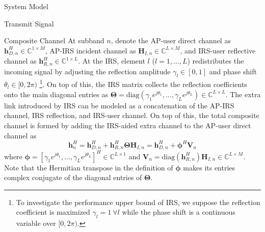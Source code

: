\documentclass{IEEEtran}
\begin{document}
\begin{section}{System Model}
\begin{subsection}{Transmit Signal}
	\end{subsection}

	\begin{subsection}{Composite Channel}
		At subband $n$, denote the AP-user direct channel as $\boldsymbol{h}_{D,n}^H \in \mathbb{C}^{1 \times M}$, AP-IRS incident channel as $\boldsymbol{H}_{I,n} \in \mathbb{C}^{L \times M}$, and IRS-user reflective channel as $\boldsymbol{h}_{R,n}^H \in \mathbb{C}^{1 \times L}$. At the IRS, element $l$ ($l=1,\dots,L$) redistributes the incoming signal by adjusting the reflection amplitude $\gamma_l \in [0,1]$ and phase shift $\theta_l \in [0,2\pi)$ \footnote{To investigate the performance upper bound of IRS, we suppose the reflection coefficient is maximized $\gamma_l=1 \ \forall l$ while the phase shift is a continuous variable over $[0,2\pi)$.}. On top of this, the IRS matrix collects the reflection coefficients onto the main diagonal entries as $\boldsymbol{\Theta} = \mathrm{diag}(\gamma_1 e^{j \theta_1}, \dots, \gamma_L e^{j \theta_L}) \in \mathbb{C}^{L \times L}$. The extra link introduced by IRS can be modeled as a concatenation of the AP-IRS channel, IRS reflection, and IRS-user channel. On top of this, the total composite channel is formed by adding the IRS-aided extra channel to the AP-user direct channel as
		\begin{equation}\label{eq:h_n}
			\boldsymbol{h}_{n}^H = \boldsymbol{h}_{D,n}^H + \boldsymbol{h}_{R,n}^H \boldsymbol{\Theta} \boldsymbol{H}_{I,n} = \boldsymbol{h}_{D,n}^H + \boldsymbol{\phi}^H \boldsymbol{V}_{n}
		\end{equation}
		where $\boldsymbol{\phi}=[\gamma_1 e^{j \theta_1}, \dots, \gamma_L e^{j \theta_L}]^H \in \mathbb{C}^{L \times 1}$ and $\boldsymbol{V}_{n}=\mathrm{diag}(\boldsymbol{h}_{R,n}^H)\boldsymbol{H}_{I,n} \in \mathbb{C}^{L \times M}$. Note that the Hermitian transpose in the definition of $\boldsymbol{\phi}$ makes its entries complex conjugate of the diagonal entries of $\boldsymbol{\Theta}$.

	\end{subsection}


\end{section}
\end{document}
